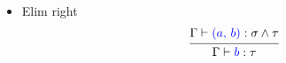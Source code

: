 \documentclass{beamer}
\begin{document}
\begin{frame}
\begin{columns}
\begin{column}{.5\textwidth}
\begin{itemize}[label=$\ast$]
      \item Elim right
      \[
        \begin{prooftree}
          \hypo{\Gamma \vdash {\color{blue} (a, \, b)} : \sigma \wedge
            \tau }
          \infer1{\Gamma \vdash {\color{blue} b} : \tau}
        \end{prooftree}
      \]
      \end{itemize}
      \endminipage
    \end{column}
  \end{columns}
\end{frame}
\end{document}
